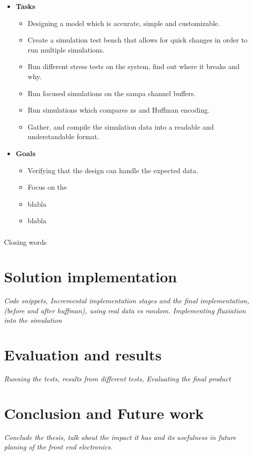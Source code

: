 \documentclass[a4paper]{report}
\begin{document}
\begin{itemize}
	\item \textbf{Tasks}
		\begin{itemize}
			\item Designing a model which is accurate, simple and customizable.
			\item Create a simulation test bench that allows for quick changes in order to run multiple simulations.
			\item Run different stress tests on the system, find out where it breaks and why.
			\item Run focused simulations on the \gls{sampa} channel buffers.
			\item Run simulations which compares \gls{zs} and Huffman encoding.
			\item Gather, and compile the simulation data into a readable and understandable format.
		\end{itemize}
	\item \textbf{Goals}
	\begin{itemize}
		\item Verifying that the design can handle the expected data.
		\item Focus on the
		\item blabla
		\item blabla
	\end{itemize}
\end{itemize}

\paragraph{}
Closing words

\chapter{Solution implementation}
\textit{Code snippets, Incremental implementation stages and the final implementation, (before and after huffman), using real data vs random. Implementing fluxiation into the simulation}
\section{}


\chapter{Evaluation and results}
\textit{Running the tests, results from different tests, Evaluating the final product}

\chapter{Conclusion and Future work}
\textit{Conclude the thesis, talk about the impact it has and its usefulness in future planing of the front end electronics.}

{}

\end{document}
